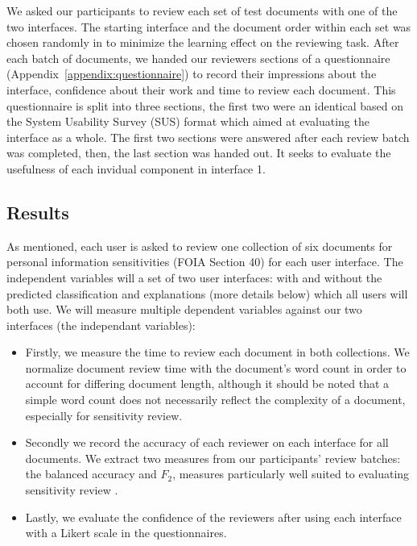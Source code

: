 \documentclass[\version]{l4proj}
\begin{document}
We asked our participants to review each set of test documents with one of the two interfaces.
The starting interface and the document order within each set was chosen randomly in to minimize the learning effect on the reviewing task.
After each batch of documents, we handed our reviewers sections of a questionnaire (Appendix~\ref{appendix:questionnaire}) to record their impressions about the interface, confidence about their work and time to review each document.
This questionnaire is split into three sections, the first two were an identical based on the System Usability Survey (SUS) format \autocite[Chap.~21]{jordanUsabilityEvaluationIndustry1996} which aimed at evaluating the interface as a whole.
The first two sections were answered after each review batch was completed, then, the last section was handed out.
It seeks to evaluate the usefulness of each invidual component in interface 1.

\subsection{Results}

As mentioned, each user is asked to review one collection of six documents for personal information sensitivities (FOIA Section 40) for each user interface.
The independent variables will a set of two user interfaces: with and without the predicted classification and explanations (more details below) which all users will both use. We will measure multiple dependent variables against our two interfaces (the independant variables):

\begin{itemize}
    \item Firstly, we measure the time to review each document in both collections.
          We normalize document review time with the document's word count in order to account for differing document length, although it should be noted that a simple word count does not necessarily reflect the complexity of a document, especially for sensitivity review.
    \item Secondly we record the accuracy of each reviewer on each interface for all documents.
          We extract two measures from our participants' review batches: the balanced accuracy and \(F_{2}\), measures particularly well suited to evaluating sensitivity review \autocite{mcdonaldStudySVMKernel2017}.
    \item Lastly, we evaluate the confidence of the reviewers after using each interface with a Likert scale in the questionnaires.
\end{itemize}
\end{document}
